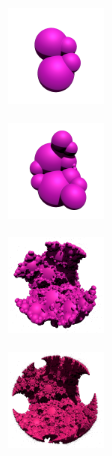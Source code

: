 \documentclass[suppldata, dvipdfmx]{interact}
\theoremstyle{plain}%
\theoremstyle{definition}
\theoremstyle{remark}
\theoremstyle{problemstyle}
\begin{document}
\begin{figure}[H]
 \begin{minipage}[t]{0.18\textwidth}
  \centering
  \includegraphics[width=1in, height=1in, keepaspectratio]{./img/visualization/sphereStep1.jpg}
  \label{fig:visualizeSpheresStep1}
 \end{minipage}
 \hspace*{\fill}
 \begin{minipage}[t]{0.18\textwidth}
  \centering
  \includegraphics[width=1in, height=1in, keepaspectratio]{./img/visualization/sphereStep2.jpg}
  \label{fig:visualizeSpheresStep2}
 \end{minipage}
 \hspace*{\fill}
 \begin{minipage}[t]{0.18\textwidth}
  \centering
  \includegraphics[width=1in, height=1in, keepaspectratio]{./img/visualization/sphereStep5.jpg}
  \label{fig:visualizeSpheresStep5}
 \end{minipage}
 \hspace*{\fill}
 \begin{minipage}[t]{0.18\textwidth}
  \centering
  \includegraphics[width=1in, height=1in, keepaspectratio]{./img/visualization/sphereStep10.jpg}
  \label{fig:visualizeSpheresStep10}
 \end{minipage}

\end{figure}
\end{document}
